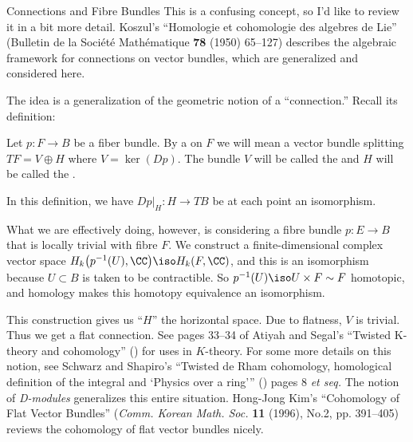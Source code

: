 \begin{Boxed}{Connections and Fibre Bundles}
This is a confusing concept, so I'd like to review it in a bit
more detail. Koszul's ``Homologie et cohomologie des algebres de
Lie'' (Bulletin de la Soci\'et\'e Math\'ematique {\bf78} (1950) 65--127)
describes the algebraic framework for connections on vector
bundles, which are generalized and considered here.

The idea is a generalization of the geometric notion
of a ``connection.'' Recall its definition:
\begin{defn}
Let $p\colon F\to B$ be a fiber bundle. By a 
on $F$ we will mean a vector bundle splitting $TF = V\oplus H$ where
$V = \ker(Dp)$. The bundle $V$ will be called the 
and $H$ will be called the .
\end{defn}
In this definition, we have $\left.Dp\right|_{H}\colon H\to TB$
be at each point an isomorphism. 

What we are effectively doing, however, is considering a fibre
bundle $p\colon E\to B$ that is locally trivial with fibre
$F$. We construct a finite-dimensional complex vector space
$H_{k}\bigl(p^{-1}(U),\CC\bigr)\iso H_{k}(F,\CC)$, and this is an
isomorphism because $U\subset B$ is taken to be contractible. So
$p^{-1}(U)\iso U\times F\homotopic F$ homotopic, and homology
makes this homotopy equivalence an isomorphism.

This construction gives us ``$H$'' the horizontal space. Due to
flatness, $V$ is trivial. Thus we get a flat connection. See
pages 33--34 of Atiyah and Segal's ``Twisted K-theory and
cohomology'' () for uses in
$K$-theory. For some more details on this notion, see Schwarz and
Shapiro's ``Twisted de Rham cohomology, homological definition of the integral and `Physics over a ring'\thinspace'' ()
pages 8 \emph{et seq.} The notion of \emph{D-modules} generalizes
this entire situation. Hong-Jong Kim's ``Cohomology of Flat
Vector Bundles'' (\emph{Comm. Korean Math. Soc.} {\bf11} (1996), No.2, pp. 391--405)
reviews the cohomology of flat vector bundles nicely.
\end{Boxed}

